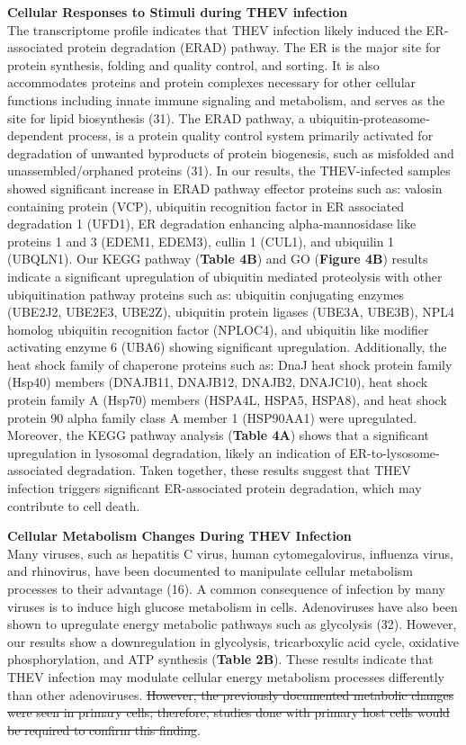 \documentclass[
]{article}
\begin{document}
\textbf{Cellular Responses to Stimuli during THEV infection}\\
The transcriptome profile indicates that THEV infection likely induced
the ER‐associated protein degradation (ERAD) pathway. The ER is the
major site for protein synthesis, folding and quality control, and
sorting. It is also accommodates proteins and protein complexes
necessary for other cellular functions including innate immune signaling
and metabolism, and serves as the site for lipid biosynthesis (31). The
ERAD pathway, a ubiquitin‐proteasome‐dependent process, is a protein
quality control system primarily activated for degradation of unwanted
byproducts of protein biogenesis, such as misfolded and
unassembled/orphaned proteins (31). In our results, the THEV-infected
samples showed significant increase in ERAD pathway effector proteins
such as: valosin containing protein (VCP), ubiquitin recognition factor
in ER associated degradation 1 (UFD1), ER degradation enhancing
alpha-mannosidase like proteins 1 and 3 (EDEM1, EDEM3), cullin 1 (CUL1),
and ubiquilin 1 (UBQLN1). Our KEGG pathway (\textbf{Table 4B}) and GO
(\textbf{Figure 4B}) results indicate a significant upregulation of
ubiquitin mediated proteolysis with other ubiquitination pathway
proteins such as: ubiquitin conjugating enzymes (UBE2J2, UBE2E3, UBE2Z),
ubiquitin protein ligases (UBE3A, UBE3B), NPL4 homolog ubiquitin
recognition factor (NPLOC4), and ubiquitin like modifier activating
enzyme 6 (UBA6) showing significant upregulation. Additionally, the heat
shock family of chaperone proteins such as: DnaJ heat shock protein
family (Hsp40) members (DNAJB11, DNAJB12, DNAJB2, DNAJC10), heat shock
protein family A (Hsp70) members (HSPA4L, HSPA5, HSPA8), and heat shock
protein 90 alpha family class A member 1 (HSP90AA1) were upregulated.
Moreover, the KEGG pathway analysis (\textbf{Table 4A}) shows that a
significant upregulation in lysosomal degradation, likely an indication
of ER-to-lysosome-associated degradation. Taken together, these results
suggest that THEV infection triggers significant ER-associated protein
degradation, which may contribute to cell death.

\textbf{Cellular Metabolism Changes During THEV Infection}\\
Many viruses, such as hepatitis C virus, human cytomegalovirus,
influenza virus, and rhinovirus, have been documented to manipulate
cellular metabolism processes to their advantage (16). A common
consequence of infection by many viruses is to induce high glucose
metabolism in cells. Adenoviruses have also been shown to upregulate
energy metabolic pathways such as glycolysis (32). However, our results
show a downregulation in glycolysis, tricarboxylic acid cycle, oxidative
phosphorylation, and ATP synthesis (\textbf{Table 2B}). These results
indicate that THEV infection may modulate cellular energy metabolism
processes differently than other adenoviruses. \st{However, the
previously documented metabolic changes were seen in primary cells;
therefore, studies done with primary host cells would be required to
confirm this finding}.
\end{document}
